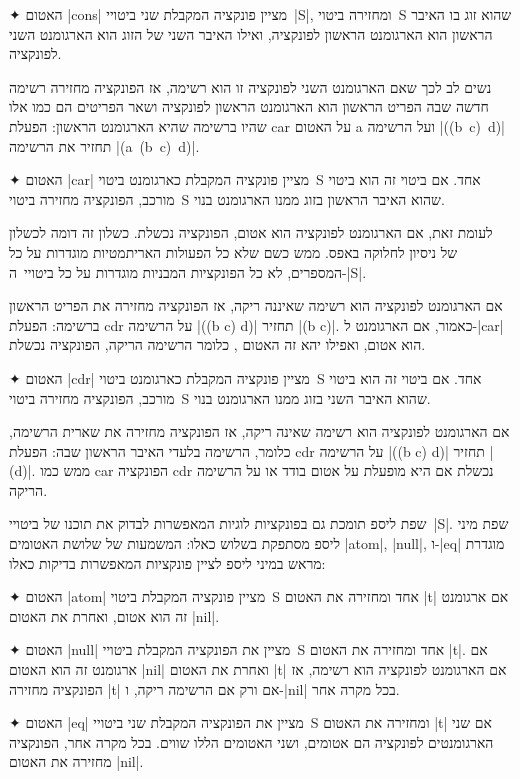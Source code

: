 \begin{enumerate}
  ✦ האטום \T|cons| מציין פונקציה המקבלת שני ביטויי~\E|S|, ומחזירה ביטוי~S
  שהוא זוג בו האיבר הראשון הוא הארגומנט הראשון לפונקציה, ואילו האיבר השני של
  הזוג הוא הארגומנט השני לפונקציה.

  נשים לב לכך שאם הארגומנט השני לפונקציה זו הוא רשימה, אז הפונקציה מחזירה רשימה
  חדשה שבה הפריט הראשון הוא הארגומנט הראשון לפונקציה ושאר הפריטים הם כמו אלו
  שהיו ברשימה שהיא הארגומנט הראשון: הפעלת car על האטום a ועל הרשימה
  \E|((b~c)~d)| תחזיר את הרשימה \E|(a~(b~c)~d)|.

  ✦ האטום \T|car| מציין פונקציה המקבלת כארגומנט ביטוי~S אחד. אם ביטוי זה הוא
  ביטוי מורכב, הפונקציה מחזירה ביטוי~S שהוא האיבר הראשון בזוג ממנו הארגומנט
  בנוי.

  לעומת זאת, אם הארגומנט לפונקציה הוא אטום, הפונקציה נכשלת. כשלון זה דומה
  לכשלון של ניסיון לחלוקה באפס. ממש כשם שלא כל הפעולות האריתמטיות מוגדרות על כל
  המספרים, לא כל הפונקציות המבניות מוגדרות על כל ביטויי~ה-\E|S|.

  אם הארגומנט לפונקציה הוא רשימה שאיננה ריקה, אז הפונקציה מחזירה את הפריט
  הראשון ברשימה: הפעלת cdr על הרשימה \E|((b c) d)| תחזיר \E|(b c)|. כאמור, אם
  הארגומנט ל-\E|car| הוא אטום, ואפילו יהא זה האטום , כלומר הרשימה
  הריקה, הפונקציה נכשלת.

  ✦ האטום \T|cdr| מציין פונקציה המקבלת כארגומנט ביטוי~S אחד. אם ביטוי זה הוא
  ביטוי מורכב, הפונקציה מחזירה ביטוי~S שהוא האיבר השני בזוג ממנו הארגומנט בנוי.

  אם הארגומנט לפונקציה הוא רשימה שאינה ריקה, אז הפונקציה מחזירה את שארית
  הרשימה, כלומר, הרשימה בלעדי האיבר הראשון שבה: הפעלת cdr על הרשימה \E|((b c)
  d)| תחזיר \E|(d)|. ממש כמו car הפונקציה cdr נכשלת אם היא מופעלת על אטום בודד
  או על הרשימה הריקה.

\end{enumerate}

שפת ליספ תומכת גם בפונקציות לוגיות המאפשרות לבדוק את תוכנו של ביטויי~\E|S|.
שפת מיני ליספ מסתפקת בשלוש כאלו: המשמעות של שלושת האטומים \T|atom|, \T|null|,
ו-\T|eq| מוגדרת מראש במיני ליספ לציין פונקציות המאפשרות בדיקות כאלו:

\begin{enumerate}
  ✦ האטום \T|atom| מציין פונקציה המקבלת ביטוי~S אחד ומחזירה את האטום \T|t| אם
  ארגומנט זה הוא אטום, ואחרת את האטום \T|nil|.

  ✦ האטום \T|null| מציין את הפונקציה המקבלת ביטויי~S אחד ומחזירה את האטום
  \T|t|. אם ארגומנט זה הוא האטום \T|nil| ואחרת את האטום \T|t| אם הארגומנט
  לפונקציה הוא רשימה, אז הפונקציה מחזירה \T|t| אם ורק אם הרשימה ריקה, ו-\T|nil|
  בכל מקרה אחר.

  ✦ האטום \T|eq| מציין את הפונקציה המקבלת שני ביטויי~S ומחזירה את האטום \T|t|
  אם שני הארגומנטים לפונקציה הם אטומים, ושני האטומים הללו שווים. בכל מקרה אחר,
  הפונקציה מחזירה את האטום \T|nil|.
\end{enumerate}

